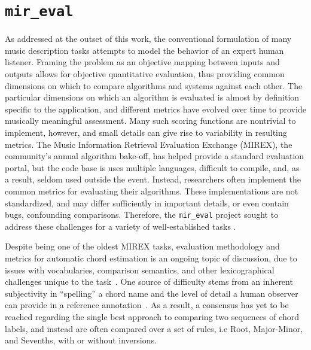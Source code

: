 \section{\texttt{mir\_eval}}
\label{sec:mir_eval}

As addressed at the outset of this work, the conventional formulation of many music description tasks attempts to model the behavior of an expert human listener.
Framing the problem as an objective mapping between inputs and outputs allows for objective quantitative evaluation, thus providing common dimensions on which to compare algorithms and systems against each other.
The particular dimensions on which an algorithm is evaluated is almost by definition specific to the application, and different metrics have evolved over time to provide musically meaningful assessment.
Many such scoring functions are nontrivial to implement, however, and small details can give rise to variability in resulting metrics.
The Music Information Retrieval Evaluation Exchange (MIREX), the community's annual algorithm bake-off, has helped provide a standard evaluation portal, but the code base is uses multiple languages, difficult to compile, and, as a result, seldom used outside the event.
Instead, researchers often implement the common metrics for evaluating their algorithms.
These implementations are not standardized, and may differ sufficiently in important details, or even contain bugs, confounding comparisons.
Therefore, the \texttt{mir\_eval} project sought to address these challenges for a variety of well-established tasks \cite{Raffel2014}.

Despite being one of the oldest MIREX tasks, evaluation methodology and metrics for automatic chord estimation is an ongoing topic of discussion, due to issues with vocabularies, comparison semantics, and other lexicographical challenges unique to the task~\cite{pauwels2013evaluating}.
One source of difficulty stems from an inherent subjectivity in ``spelling'' a chord name and the level of detail a human observer can provide in a reference annotation~\cite{ni2013understanding}.
As a result, a consensus has yet to be reached regarding the single best approach to comparing two sequences of chord labels, and instead are often compared over a set of rules, i.e Root, Major-Minor, and Sevenths, with or without inversions.

